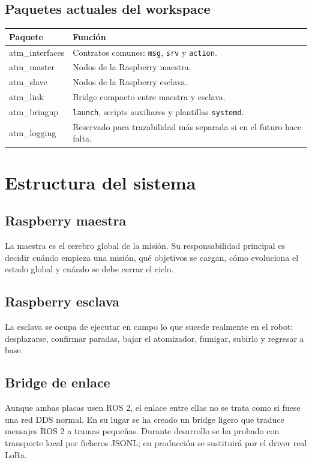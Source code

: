 \documentclass[11pt,a4paper]{article}
\begin{document}
\subsection{Paquetes actuales del workspace}
\begin{center}
\begin{tabularx}{\textwidth}{>{\ttfamily}l X}
\toprule
Paquete & Funci\'on \\
\midrule
atm\_interfaces & Contratos comunes: \texttt{msg}, \texttt{srv} y \texttt{action}. \\
atm\_master & Nodos de la Raspberry maestra. \\
atm\_slave & Nodos de la Raspberry esclava. \\
atm\_link & Bridge compacto entre maestra y esclava. \\
atm\_bringup & \texttt{launch}, scripts auxiliares y plantillas \texttt{systemd}. \\
atm\_logging & Reservado para trazabilidad m\'as separada si en el futuro hace falta. \\
\bottomrule
\end{tabularx}
\end{center}

\section{Estructura del sistema}
\subsection{Raspberry maestra}
La maestra es el cerebro global de la misi\'on. Su responsabilidad principal es decidir cu\'ando empieza una misi\'on, qu\'e objetivos se cargan, c\'omo evoluciona el estado global y cu\'ando se debe cerrar el ciclo.

\subsection{Raspberry esclava}
La esclava se ocupa de ejecutar en campo lo que sucede realmente en el robot: desplazarse, confirmar paradas, bajar el atomizador, fumigar, subirlo y regresar a base.

\subsection{Bridge de enlace}
Aunque ambas placas usen ROS 2, el enlace entre ellas no se trata como si fuese una red DDS normal. En su lugar se ha creado un bridge ligero que traduce mensajes ROS 2 a tramas peque\~nas. Durante desarrollo se ha probado con transporte local por ficheros JSONL; en producci\'on se sustituir\'a por el driver real LoRa.
\end{document}
